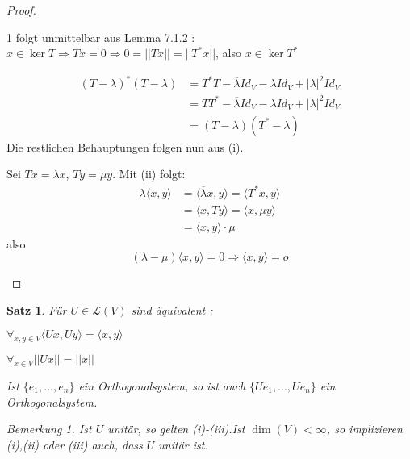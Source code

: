\documentclass[12pt,a4paper]{article}
\newtheorem{theorem}{Satz}
\theoremstyle{definition}
\theoremstyle{remark}
\newtheorem*{remark}{Bemerkung}
\renewcommand{\bar}[1]{\overline{#1}}
\begin{document}
	\begin{proof} 
		\begin{proofenum}
			\item 1 folgt unmittelbar aus Lemma 7.1.2 :\\
				$x \in \ker T \Rightarrow Tx = 0 \Rightarrow 0 = ||Tx || = ||T^*x||$, also $x \in \ker T^*$
			\item 
				\begin{equation}
					\begin{split}
						(T-\lambda)^*(T - \lambda) &= T^*T- \bar{\lambda}Id_V-\lambda Id_V + |\lambda|^2Id_V \\
						&= TT^*- \bar{\lambda}Id_V-\lambda Id_V + |\lambda|^2Id_V \\
						&= (T-\lambda)(T^*-\lambda)
					\end{split}
				\end{equation}
				Die restlichen Behauptungen folgen nun aus (i).
			\item Sei $Tx = \lambda x$, $Ty = \mu y$. Mit (ii) folgt: 
				\begin{equation}
					\begin{split}
						\lambda \langle x,y \rangle &= \langle \bar{\lambda}x,y \rangle = \langle T^*x,y \rangle \\
						&= \langle x, Ty \rangle = \langle x, \mu y \rangle \\
						&= \langle x,y \rangle \cdot \mu
					\end{split}
				\end{equation}
				also 
				\begin{equation}
					(\lambda - \mu) \langle x,y \rangle = 0 
					\Rightarrow \langle x,y \rangle = o
				\end{equation}
		\end{proofenum}
	\end{proof}
	
	\begin{theorem}
		Für $U \in \mathcal{L}(V)$ sind äquivalent : \\
		\begin{proofenum}	
			\item $\forall_{x,y \in V} \langle Ux, Uy \rangle = \langle x,y \rangle$ \\
			\item $\forall_{x \in V} || Ux|| = ||x||$
			\item Ist $\{ e_1,...,e_n \}$ ein Orthogonalsystem, so ist auch $\{ Ue_1,...,Ue_n \}$ ein Orthogonalsystem.
		\end{proofenum}
		\begin{remark}
			Ist $U$ unitär, so gelten (i)-(iii).Ist $\dim (V)<\infty$, so implizieren (i),(ii) oder (iii) auch, dass $U$ unitär ist.
		\end{remark}
	\end{theorem}
	
\end{document}
